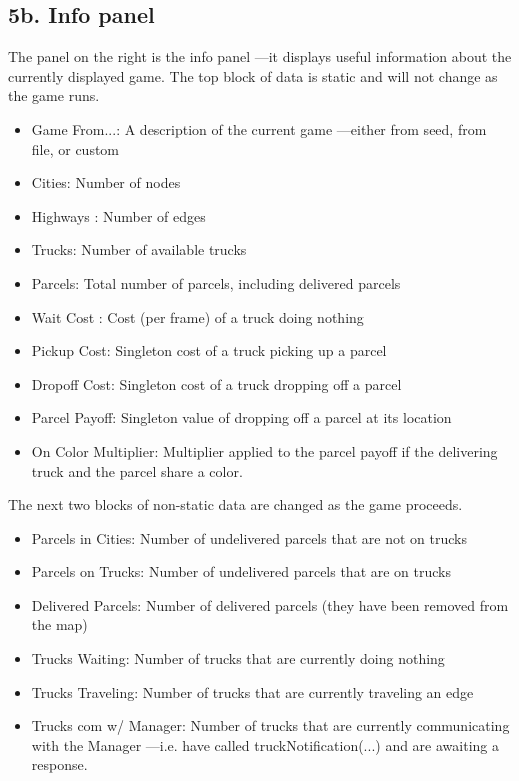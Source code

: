 \documentclass[11pt]{article}
\begin{document}
\subsection{5b. Info panel}
The panel on the right is the info panel ---it displays useful information about the currently displayed game.
The top block of data is static and will not change as the game runs.
\begin{itemize}
\item Game From...: A description of the current game ---either from seed, from file, or custom
\item Cities: Number of nodes
\item Highways : Number of edges
\item Trucks:  Number of available trucks
\item Parcels:  Total number of parcels, including delivered parcels
\item Wait Cost : Cost (per frame) of a truck doing nothing
\item Pickup Cost: Singleton cost of a truck picking up a parcel
\item Dropoff Cost: Singleton cost of a truck dropping off a parcel
\item Parcel Payoff: Singleton value of dropping off a parcel at its location
\item On Color Multiplier: Multiplier applied to the parcel payoff if the delivering truck and the parcel share a color.
\end{itemize}

The next two blocks of non-static data are changed as the game proceeds.
\begin{itemize}
\item Parcels in Cities: Number of undelivered parcels that are not on trucks
\item Parcels on Trucks: Number of undelivered parcels that are on trucks
\item Delivered Parcels: Number of delivered parcels (they have been removed from the map)
\item Trucks Waiting: Number of trucks that are currently doing nothing
\item Trucks Traveling: Number of trucks that are currently traveling an edge
\item Trucks com w/ Manager: Number of trucks that are currently communicating with the Manager —i.e. have called truckNotification(...) and are awaiting a response.
\end{itemize}
\end{document}
